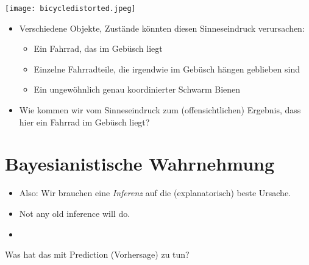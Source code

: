 \documentclass[11pt, handout]{beamer}
\begin{document}
\begin{frame}[plain]
  \begin{center}
    \texttt{[image: bicycledistorted.jpeg]}
  \end{center}
\end{frame}

\begin{frame}
  \begin{itemize}[<+->]
  \item Verschiedene Objekte, Zustände könnten diesen Sinneseindruck
    verursachen:
    \begin{itemize}[<+->]
    \item Ein Fahrrad, das im Gebüsch liegt
    \item Einzelne Fahrradteile, die irgendwie im Gebüsch hängen
      geblieben sind
    \item Ein ungewöhnlich genau koordinierter Schwarm Bienen
    \end{itemize}
  \item Wie kommen wir vom Sinneseindruck zum (offensichtlichen)
    Ergebnis, dass hier ein Fahrrad im Gebüsch liegt?
  \end{itemize}

\end{frame}

\section{Bayesianistische Wahrnehmung}

\begin{frame}
  \begin{itemize}[<+->]
  \item Also: Wir brauchen eine \emph{Inferenz} auf die (explanatorisch) beste Ursache.
  \item Not any old inference will do.
  \item 
  \end{itemize}
\end{frame}



\begin{frame}
Was hat das mit Prediction (Vorhersage) zu tun?

\end{frame}
\end{document}
